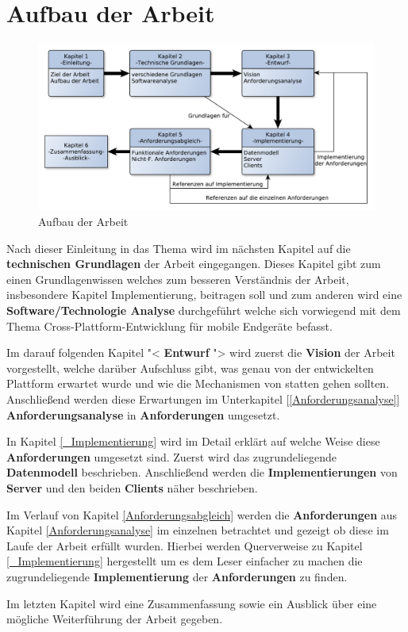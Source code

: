 \section{Aufbau der Arbeit}
\begin{figure}[H]
	\centering
	\includegraphics[scale=0.55]{images/AufbauDerArbeit}
	\caption[Aufbau der Arbeit]{Aufbau der Arbeit}
	\label{AufbauDerArbeit}
\end{figure}
Nach dieser Einleitung in das Thema wird im nächsten Kapitel auf die \textbf{technischen Grundlagen} der Arbeit eingegangen. Dieses Kapitel gibt zum einen Grundlagenwissen welches zum besseren Verständnis der Arbeit, insbesondere Kapitel Implementierung, beitragen soll und zum anderen wird eine \textbf{Software/Technologie Analyse} durchgeführt welche sich vorwiegend mit dem Thema Cross-Plattform-Entwicklung für mobile Endgeräte befasst.

Im darauf folgenden Kapitel "< \textbf{Entwurf} "> wird zuerst die \textbf{Vision} der Arbeit vorgestellt, welche darüber Aufschluss gibt, was genau von der entwickelten Plattform erwartet wurde und wie die Mechanismen von statten gehen sollten. Anschließend werden diese Erwartungen im Unterkapitel [\ref{Anforderungsanalyse}] \textbf{Anforderungsanalyse} in \textbf{Anforderungen} umgesetzt. 

In Kapitel \ref{_Implementierung} wird im Detail erklärt auf welche Weise diese \textbf{Anforderungen} umgesetzt sind. Zuerst wird das zugrundeliegende \textbf{Datenmodell} beschrieben. Anschließend werden die \textbf{Implementierungen} von \textbf{Server} und den beiden \textbf{Clients} näher beschrieben.

Im Verlauf von Kapitel \ref{Anforderungsabgleich} werden die \textbf{Anforderungen} aus Kapitel \ref{Anforderungsanalyse} im einzelnen betrachtet und gezeigt ob diese im Laufe der Arbeit erfüllt wurden. Hierbei werden Querverweise zu Kapitel \ref{_Implementierung} hergestellt um es dem Leser einfacher zu machen die zugrundeliegende \textbf{Implementierung} der \textbf{Anforderungen} zu finden.

Im letzten Kapitel wird eine Zusammenfassung sowie ein Ausblick über eine mögliche Weiterführung der Arbeit gegeben.

